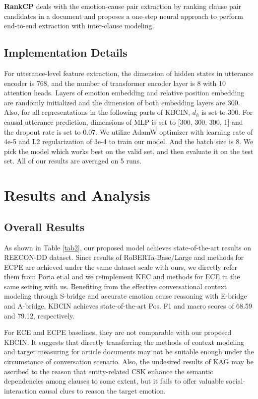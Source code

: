 \documentclass[letterpaper]{article} \usepackage{aaai23}  \usepackage{times}  \usepackage{helvet}  \usepackage{courier}  \usepackage[hyphens]{url}  \usepackage{graphicx} \urlstyle{rm} \def\UrlFont{\rm}  \usepackage{natbib}  \usepackage{caption} \frenchspacing  \setlength{\pdfpagewidth}{8.5in} \setlength{\pdfpageheight}{11in} \usepackage{algorithm}
\begin{document}
\textbf{RankCP} \cite{rankcp} deals with the emotion-cause pair extraction by ranking clause pair candidates in a document and proposes a one-step neural approach to perform end-to-end extraction with inter-clause modeling.

\subsection{Implementation Details}
For utterance-level feature extraction, the dimension of hidden states in utterance encoder is 768, and the number of transformer encoder layer is 8 with 10 attention heads. Layers of emotion embedding and relative position embedding are randomly initialized and the dimension of both embedding layers are 300. Also, for all representations in the following parts of KBCIN, $d_h$ is set to 300. For causal utterance prediction, dimensions of MLP is set to [300, 300, 300, 1] and the dropout rate is set to 0.07. We utilize AdamW optimizer with learning rate of 4e-5 and L2 regularization of 3e-4 to train our model. And the batch size is 8. We pick the model which works best on the valid set, and then evaluate it on the test set. All of our results are averaged on 5 runs.

\section{Results and Analysis}
\subsection{Overall Results}
As shown in Table \ref{tab2}, our proposed model achieves state-of-the-art results on REECON-DD dataset. Since results of RoBERTa-Base/Large and methods for ECPE are achieved under the same dataset scale with ours, we directly refer them from Poria et.al  and we reimplement KEC and methods for ECE in the same setting with us. Benefiting from the effective conversational context modeling through S-bridge and accurate emotion cause reasoning with E-bridge and A-bridge, KBCIN achieves state-of-the-art Pos. F1 and macro scores of 68.59 and 79.12, respectively.

For ECE and ECPE baselines, they are not comparable with our proposed KBCIN. It suggests that directly transferring the methods of context modeling and target measuring for article documents may not be suitable enough under the circumstance of conversation scenario. Also, the undesired results of KAG may be ascribed to the reason that entity-related CSK enhance the semantic dependencies among clauses to some extent, but it fails to offer valuable social-interaction causal clues to reason the target emotion.
\end{document}
